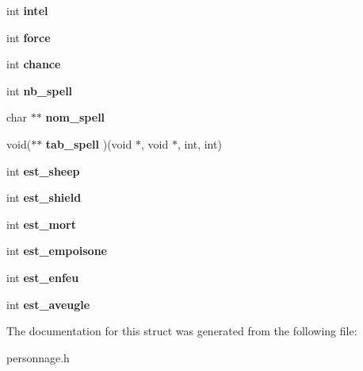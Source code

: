\begin{DoxyCompactItemize}
int {\bfseries intel}
\item 
\mbox{\label{structpersonnage__s_a37d215db466673a5038530a299b128d6}} 
int {\bfseries force}
\item 
\mbox{\label{structpersonnage__s_a6aa70c6e90f17e92e6f2104e859f2877}} 
int {\bfseries chance}
\item 
\mbox{\label{structpersonnage__s_a539619f80372d4d291965f5e617a916c}} 
int {\bfseries nb\+\_\+spell}
\item 
\mbox{\label{structpersonnage__s_ab9d8f3c2563b277f1f60df0dac69a831}} 
char $\ast$$\ast$ {\bfseries nom\+\_\+spell}
\item 
\mbox{\label{structpersonnage__s_a57537963af9837b187ac439940bf8033}} 
void($\ast$$\ast$ {\bfseries tab\+\_\+spell} )(void $\ast$, void $\ast$, int, int)
\item 
\mbox{\label{structpersonnage__s_adb180a3452342c63fde618a74a562b61}} 
int {\bfseries est\+\_\+sheep}
\item 
\mbox{\label{structpersonnage__s_a410589f0eff83eb913aa3dae57ab237e}} 
int {\bfseries est\+\_\+shield}
\item 
\mbox{\label{structpersonnage__s_a62d51d06e320afa0afffa67249d177fb}} 
int {\bfseries est\+\_\+mort}
\item 
\mbox{\label{structpersonnage__s_a4ca45dd88f37f11979791f46663397ea}} 
int {\bfseries est\+\_\+empoisone}
\item 
\mbox{\label{structpersonnage__s_a4056010693d1e0e595275da41ded319e}} 
int {\bfseries est\+\_\+enfeu}
\item 
\mbox{\label{structpersonnage__s_aa6e35250bb53c64c2cbba45c3f8f1a77}} 
int {\bfseries est\+\_\+aveugle}
\end{DoxyCompactItemize}


The documentation for this struct was generated from the following file\+:\begin{DoxyCompactItemize}
\item 
personnage.\+h\end{DoxyCompactItemize}
